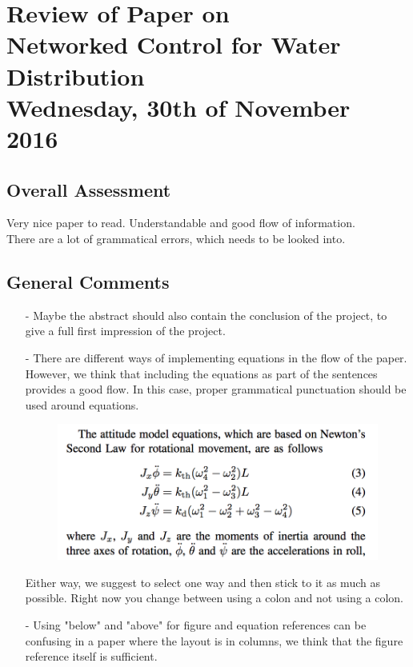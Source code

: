 
\renewcommand{\vec}[1]{\boldsymbol{\mathbf{#1}}}

\renewcommand\chaptername{KAPITEL}
\renewcommand\contentsname{Indhold}
\renewcommand\figurename{Figur}
\renewcommand\tablename{Tabel}

\section*{Review of Paper on\\
Networked Control for Water Distribution\\
\small Wednesday, 30th of November 2016}
\subsection{Overall Assessment}
Very nice paper to read. Understandable and good flow of information. \\
There are a lot of grammatical errors, which needs to be looked into.  
\subsection{General Comments}
\begin{itemize}
	\item[-] Maybe the abstract should also contain the conclusion of the project, to give a full first impression of the project.
	\item[-]
There are different ways of implementing equations in the flow of the paper. However, we think that including the equations as part of the sentences provides a good flow. In this case, proper grammatical punctuation should be used around equations.\\
\begin{figure}[H]
    \centering
    \includegraphics[width=.4\textwidth]{equation.PNG}
\end{figure}

Either way, we suggest to select one way and then stick to it as much as possible. Right now you change between using a colon and not using a colon. 
\item[-]Using "below" and "above" for figure and equation references can be confusing in a paper where the layout is in columns, we think that the figure reference itself is sufficient.
\end{itemize}	

